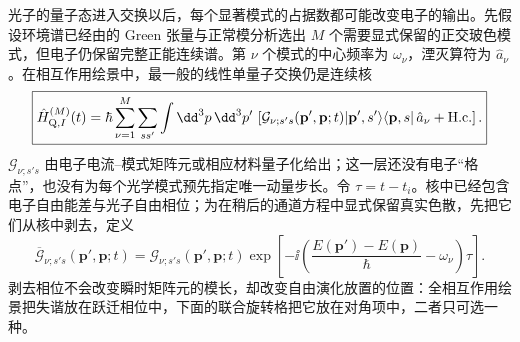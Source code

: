 
光子的量子态进入交换以后，每个显著模式的占据数都可能改变电子的输出。先假设环境谱已经由的 Green 张量与正常模分析选出 $M$ 个需要显式保留的正交玻色模式，但电子仍保留完整正能连续谱。第 $\nu$ 个模式的中心频率为 $\omega_\nu$，湮灭算符为 $\hat a_\nu$。在相互作用绘景中，最一般的线性单量子交换仍是连续核
\begin{equation}
\boxed{
\hat H_{{\rm Q},I}^{(M)}(t)
=
\hbar
\sum_{\nu=1}^{M}
\sum_{ss'}
\int\dd^3p\,\dd^3p'\,
\left[
\mathcal G_{\nu;s's}(\mathbf p',\mathbf p;t)
|\mathbf p',s'\rangle\langle\mathbf p,s|
\,\hat a_\nu
+\mathrm{H.c.}
\right].}
\label{eq:multimode_qpinem_continuous_kernel_dp101}
\end{equation}
$\mathcal G_{\nu;s's}$ 由电子电流--模式矩阵元或相应材料量子化给出；这一层还没有电子“格点”，也没有为每个光学模式预先指定唯一动量步长。令 $\tau=t-t_i$。核中已经包含电子自由能差与光子自由相位；为在稍后的通道方程中显式保留真实色散，先把它们从核中剥去，定义
\begin{equation}
 \overline{\mathcal G}_{\nu;s's}(\mathbf p',\mathbf p;t)
 =\mathcal G_{\nu;s's}(\mathbf p',\mathbf p;t)
 \exp\!\left[-\ii\left(\frac{E(\mathbf p')-E(\mathbf p)}\hbar
                        -\omega_\nu\right)\tau\right].
 \label{eq:feqo-multimode-coupling-frame}
\end{equation}
剥去相位不会改变瞬时矩阵元的模长，却改变自由演化放置的位置：全相互作用绘景把失谐放在跃迁相位中，下面的联合旋转格把它放在对角项中，二者只可选一种。

